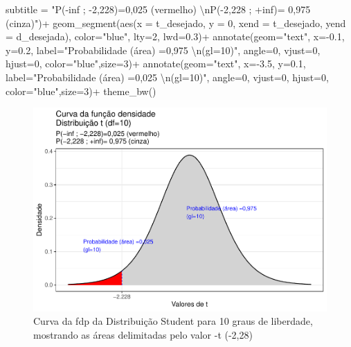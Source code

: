 \documentclass[
]{book}
\newenvironment{Shaded}{\begin{snugshade}}{\end{snugshade}}
\newcommand{\AttributeTok}[1]{\textcolor[rgb]{0.77,0.63,0.00}{#1}}
\newcommand{\DecValTok}[1]{\textcolor[rgb]{0.00,0.00,0.81}{#1}}
\newcommand{\FloatTok}[1]{\textcolor[rgb]{0.00,0.00,0.81}{#1}}
\newcommand{\FunctionTok}[1]{\textcolor[rgb]{0.00,0.00,0.00}{#1}}
\newcommand{\NormalTok}[1]{#1}
\newcommand{\SpecialCharTok}[1]{\textcolor[rgb]{0.00,0.00,0.00}{#1}}
\newcommand{\StringTok}[1]{\textcolor[rgb]{0.31,0.60,0.02}{#1}}
\begin{document}
\begin{Shaded}
\begin{Highlighting}[]
       \AttributeTok{subtitle =} \StringTok{"P({-}inf ; {-}2,228)=0,025 (vermelho) }\SpecialCharTok{\textbackslash{}n}\StringTok{P({-}2,228 ; +inf)= 0,975 (cinza)"}\NormalTok{)}\SpecialCharTok{+}
  \FunctionTok{geom\_segment}\NormalTok{(}\FunctionTok{aes}\NormalTok{(}\AttributeTok{x =}\NormalTok{ t\_desejado, }\AttributeTok{y =} \DecValTok{0}\NormalTok{, }\AttributeTok{xend =}\NormalTok{ t\_desejado, }\AttributeTok{yend =}\NormalTok{ d\_desejada), }\AttributeTok{color=}\StringTok{"blue"}\NormalTok{, }\AttributeTok{lty=}\DecValTok{2}\NormalTok{, }\AttributeTok{lwd=}\FloatTok{0.3}\NormalTok{)}\SpecialCharTok{+}
  \FunctionTok{annotate}\NormalTok{(}\AttributeTok{geom=}\StringTok{"text"}\NormalTok{, }\AttributeTok{x=}\SpecialCharTok{{-}}\FloatTok{0.1}\NormalTok{, }\AttributeTok{y=}\FloatTok{0.2}\NormalTok{, }\AttributeTok{label=}\StringTok{"Probabilidade (área) =0,975 }\SpecialCharTok{\textbackslash{}n}\StringTok{(gl=10)"}\NormalTok{, }\AttributeTok{angle=}\DecValTok{0}\NormalTok{, }\AttributeTok{vjust=}\DecValTok{0}\NormalTok{, }\AttributeTok{hjust=}\DecValTok{0}\NormalTok{, }\AttributeTok{color=}\StringTok{"blue"}\NormalTok{,}\AttributeTok{size=}\DecValTok{3}\NormalTok{)}\SpecialCharTok{+}
  \FunctionTok{annotate}\NormalTok{(}\AttributeTok{geom=}\StringTok{"text"}\NormalTok{, }\AttributeTok{x=}\SpecialCharTok{{-}}\FloatTok{3.5}\NormalTok{, }\AttributeTok{y=}\FloatTok{0.1}\NormalTok{, }\AttributeTok{label=}\StringTok{"Probabilidade (área) =0,025 }\SpecialCharTok{\textbackslash{}n}\StringTok{(gl=10)"}\NormalTok{, }\AttributeTok{angle=}\DecValTok{0}\NormalTok{, }\AttributeTok{vjust=}\DecValTok{0}\NormalTok{, }\AttributeTok{hjust=}\DecValTok{0}\NormalTok{, }\AttributeTok{color=}\StringTok{"blue"}\NormalTok{,}\AttributeTok{size=}\DecValTok{3}\NormalTok{)}\SpecialCharTok{+}
  \FunctionTok{theme\_bw}\NormalTok{()}
\end{Highlighting}
\end{Shaded}

\begin{figure}

{\centering \includegraphics{apostila_files/figure-latex/fig28-1} 

}

\caption{Curva da fdp da Distribuição Student para 10 graus de liberdade, mostrando as áreas delimitadas pelo valor -t (-2,28)}\label{fig:fig28}
\end{figure}
\end{document}
